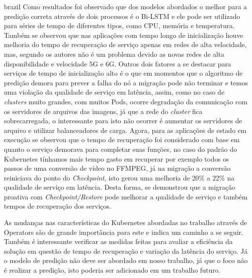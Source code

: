 \begin{otherlanguage*}{brazil}
Como resultados foi observado que dos modelos abordados o melhor para a predição
correta através de dois processos é o Bi-LSTM e ele pode ser utilizado para séries
de tempo de diferentes tipos, como CPU, memória e temperatura. Também se observou
que nas aplicações com tempo longo de inicialização houve melhoria do tempo de
recuperação de serviço apenas em redes de alta velocidade, mas, segundo os autores
não é um problema devido as novas redes de alta disponibilidade e velocidade 5G e
6G. Outros dois fatores a se destacar para serviços de tempo de inicialização alto
é o que em momentos que o algoritmo de predição demora para prever a falha do nó
a migração pode não terminar e temos uma violação da qualidade de serviço em latência,
assim, como no caso de \textit{clusters} muito grandes, com muitos Pods, ocorre
degradação da comunicação com os servidores de arquivos das imagens, já que a rede
do \textit{cluster} fica sobrecarregada, o interessante para isto não ocorrer é
aumentar os servidores de arquivo e utilizar balanceadores de carga. Agora, para
as aplicações de estado em execução se observou que o tempo de recuperação foi
considerado com base em quanto o serviço demorava para completar suas funções, no
caso do padrão do Kubernetes tínhamos mais tempo gasto em recuperar por exemplo
todos os passos de uma conversão de vídeo no FFMPEG, já na migração a conversão
reiniciava do ponto do \textit{Checkpoint}, isto gerou uma melhoria de 20\% a 22\%
na qualidade de serviço em latência. Desta forma, se demonstrou que a migração
proativa com \textit{Checkpoint/Restore} pode melhorar a qualidade de serviço e
também tempos de recuperação dos serviços.

As mudanças nas características do Kubernetes abordadas no trabalho através de
Operators são de grande importância para este e indica um caminho a se seguir.
Também é interessante verificar as medidas feitas para avaliar a eficiência da
solução em questão de tempo de recuperação e variação da latência do serviço. Já
o modelo de predição não deve ser abordado em nosso trabalho, já que o foco não
é realizar a predição, isto poderia ser adicionado em um trabalho futuro.

\end{otherlanguage*}
